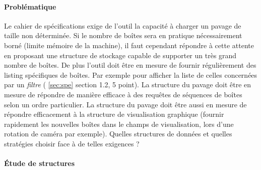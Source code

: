 \paragraph{Problématique}
Le cahier de spécifications exige de l'outil la capacité à charger un pavage de taille non déterminée. Si le nombre de boîtes sera en pratique nécessairement borné (limite mémoire de la machine), il faut cependant répondre à cette attente en proposant une structure de stockage capable de supporter un très grand nombre de boîtes. De plus l'outil doit être en mesure de fournir régulièrement des listing spécifiques de boîtes. Par exemple pour afficher la liste de celles concernées par un \emph{filtre} (\cf{} \ref{sec:spe} section 1.2, 5 point). La structure du pavage doit être en mesure de répondre de manière efficace à des requêtes de séquences de boîtes selon un ordre particulier. La structure du pavage doit être aussi en mesure de répondre efficacement à la structure  de visualisation graphique (fournir rapidement les nouvelles boîtes dans le champs de visualisation, lors d'une rotation de caméra par exemple). Quelles structures de données et quelles stratégies choisir face à de telles exigences ?  %



\paragraph{Étude de structures}

